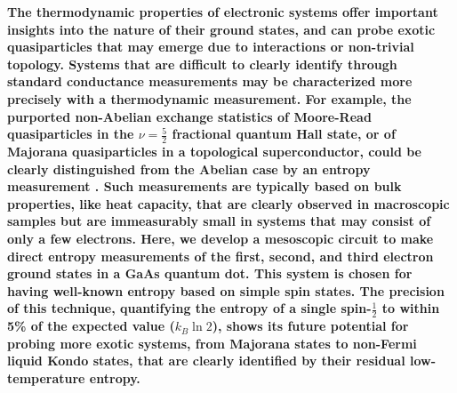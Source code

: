 \documentclass[twocolumn,showpacs,amsmath,amssymb,prl,aps,superscriptaddress]{revtex4-1}
\begin{document}
\maketitle

\textbf{The thermodynamic properties of electronic systems offer important insights into the nature of their ground states, and can probe exotic quasiparticles that may emerge due to interactions or non-trivial topology.  Systems that are difficult to clearly identify through standard conductance measurements may be characterized more precisely with a thermodynamic measurement. For example, the purported non-Abelian exchange statistics of Moore-Read quasiparticles in the $\nu = \frac{5}{2}$ fractional quantum Hall state, or of Majorana quasiparticles in a topological superconductor, could be clearly distinguished from the Abelian case by an entropy measurement \cite{Cooper2009, Smirnov2015}.  Such measurements are typically based on bulk properties, like heat capacity, that are clearly observed in macroscopic samples but are immeasurably small in systems that may consist of only a few electrons.  Here, we develop a mesoscopic circuit to make direct entropy measurements of the first, second, and third electron ground states in a GaAs quantum dot.  This system is chosen for having well-known entropy based on simple spin states\cite{Tarucha1996, Ciorga2000, Duncan2000, Lindemann2002, Potok2003, Hofmann2016}.  The precision of this technique, quantifying the entropy of a single spin-$\frac{1}{2}$ to within 5\% of the expected value ($k_B \ln{2}$), shows its future potential for probing more exotic systems, from Majorana states to non-Fermi liquid Kondo states, that are clearly identified by their residual low-temperature entropy\cite{Alkurtass2016}.}
\end{document}

